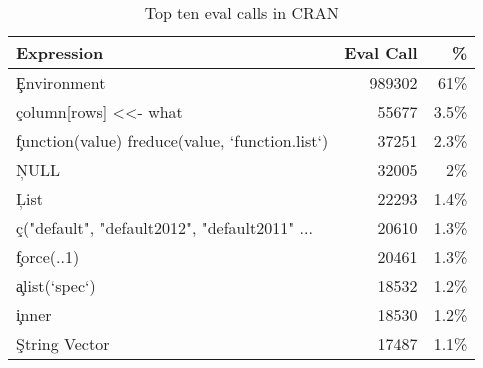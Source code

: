 \documentclass[screen,acmsmall]{acmart}
\begin{document}
\begin{table}[!h]  \centering
\begin{tabular}{@{}l@{~}|@{~}r@{~}r@{}} \hline
Expression & Eval Call &  \% \\\hline
\c{Environment} &                                  989302   & 61\%\\
\c{column[rows] <<- what} &                        55677    & 3.5\%\\
\c{function(value) freduce(value, `function.list`)} & 37251& 2.3\%\\
\c{NULL} &                         32005    & 2\%\\
\c{List} &                         22293    & 1.4\%\\
\c{c("default", "default2012", "default2011" ...}& 20610    & 1.3\%\\
\c{force(..1)}            &                        20461    & 1.3\%\\
\c{alist(`spec`)}       &                         18532    & 1.2\%\\
\c{inner}               &                          18530    & 1.2\%\\
\c{String Vector}      &                           17487     & 1.1\%\\
\end{tabular}\caption{Top ten eval calls in CRAN} \label{C}
\end{table}
\end{document}

